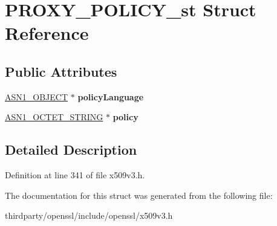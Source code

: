 \hypertarget{struct_p_r_o_x_y___p_o_l_i_c_y__st}{}\section{P\+R\+O\+X\+Y\+\_\+\+P\+O\+L\+I\+C\+Y\+\_\+st Struct Reference}
\label{struct_p_r_o_x_y___p_o_l_i_c_y__st}
\subsection*{Public Attributes}
\begin{DoxyCompactItemize}
\item 
\mbox{\label{struct_p_r_o_x_y___p_o_l_i_c_y__st_ab3fa64c1bd1d75d3433ec2c57ad2c764}} 
\hyperlink{structasn1__object__st}{A\+S\+N1\+\_\+\+O\+B\+J\+E\+CT} $\ast$ {\bfseries policy\+Language}
\item 
\mbox{\label{struct_p_r_o_x_y___p_o_l_i_c_y__st_ac3360dfde3677ca63163277535db0dc2}} 
\hyperlink{structasn1__string__st}{A\+S\+N1\+\_\+\+O\+C\+T\+E\+T\+\_\+\+S\+T\+R\+I\+NG} $\ast$ {\bfseries policy}
\end{DoxyCompactItemize}


\subsection{Detailed Description}


Definition at line 341 of file x509v3.\+h.



The documentation for this struct was generated from the following file\+:\begin{DoxyCompactItemize}
\item 
thirdparty/openssl/include/openssl/x509v3.\+h\end{DoxyCompactItemize}

